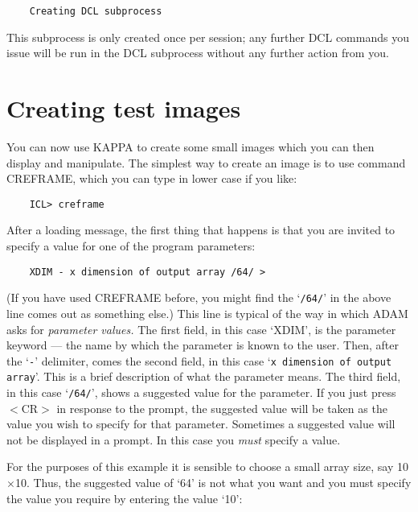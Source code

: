 \begin{small}
\begin{verbatim}
    Creating DCL subprocess
\end{verbatim}
\end{small}

This subprocess is only created once per session; any further DCL commands you
issue will be run in the DCL subprocess without any further action from you.

\section{Creating test images}
\label{S_creimag}

You can now use KAPPA to create some small images which you can then display
and manipulate.
The simplest way to create an image is to use command CREFRAME, which
you can type in lower case if you like:

\begin{small}
\begin{verbatim}
    ICL> creframe
\end{verbatim}
\end{small}

After a loading message, the first thing that happens is that you are invited
to specify a value for one of the program parameters:

\begin{small}
\begin{verbatim}
    XDIM - x dimension of output array /64/ >
\end{verbatim}
\end{small}

(If you have used CREFRAME before, you might find the `\verb+/64/+' in the
above
line comes out as something else.)
This line is typical of the way in which ADAM asks for {\em parameter values.}
The first field, in this case `XDIM', is the parameter keyword --- the name by
which the parameter is known to the user.
Then, after the `\verb+-+' delimiter, comes the second field, in this case
`\verb+x dimension of output array+'.
This is a brief description of what the parameter means.
The third field, in this case `\verb+/64/+', shows a suggested value for the
parameter.
If you just press $<$CR$>$ in response to the prompt, the suggested value will
be taken as the value you wish to specify for that parameter.
Sometimes a suggested value will not be displayed in a prompt.
In this case you {\em must} specify a value.

For the purposes of this example it is sensible to choose a small array size,
say 10$\times$10.
Thus, the suggested value of `64' is not what you want and you must specify
the value you require by entering the value `10':

